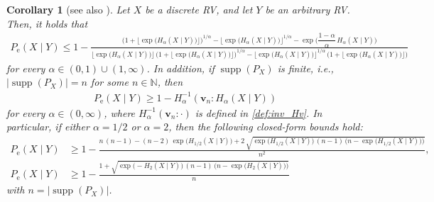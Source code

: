\documentclass[conference, draftcls, onecolumn]{IEEEtran}
\theoremstyle{plain}
\newtheorem{corollary}{Corollary}
\newcommand{\bvec}[1]{\boldsymbol{#1}}
\newcommand{\supp}{\operatorname{supp}}
\begin{document}
\begin{corollary}[{see also \cite[Theorems~5 and~12]{sason}}]
\label{cor:bound_Pe}
Let $X$ be a discrete RV, and let $Y$ be an arbitrary RV.
Then, it holds that
\begin{align}
P_{\mathrm{e}}(X \mid Y)
\le
1 - \frac{ \Big(1 + \Big\lfloor \exp \big( H_{\alpha}(X \mid Y) \big) \Big\rfloor \Big)^{1/\alpha} - \Big\lfloor \exp \big( H_{\alpha}(X \mid Y) \big) \Big\rfloor^{1/\alpha} - \exp \Big( \dfrac{ 1 - \alpha }{ \alpha } \, H_{\alpha}(X \mid Y) \Big) }{ \Big\lfloor \exp \big( H_{\alpha}(X \mid Y) \big) \Big\rfloor \, \Big(1 + \Big\lfloor \exp \big( H_{\alpha}(X \mid Y) \big) \Big\rfloor\Big)^{1/\alpha} - \Big\lfloor \exp \big( H_{\alpha}(X \mid Y) \big) \Big\rfloor^{1/\alpha} \, \Big(1 + \Big\lfloor \exp \big( H_{\alpha}(X \mid Y) \big) \Big\rfloor\Big) }
\label{eq:Pe_UB}
\end{align}
for every $\alpha \in (0, 1) \cup (1, \infty)$.
In addition, if $\supp( P_{X} )$ is finite, i.e., $|\!\supp( P_{X} )| = n$ for some $n \in \mathbb{N}$, then
\begin{align}
P_{\mathrm{e}}(X \mid Y)
\ge
1 - H_{\alpha}^{-1}( \bvec{v}_{n} : H_{\alpha}(X \mid Y) )
\label{eq:Pe_LB}
\end{align}
for every $\alpha \in (0, \infty)$, where $H_{\alpha}^{-1}( \bvec{v}_{n} : \cdot )$ is defined in \eqref{def:inv_Hv}.
In particular, if either $\alpha = 1/2$ or $\alpha = 2$, then the following closed-form bounds hold:
\begin{align}
P_{\mathrm{e}}(X \mid Y)
& \ge
1 - \frac{ n \, (n - 1) - (n-2) \, \exp\big( H_{1/2}(X \mid Y) \big) + 2 \, \sqrt{ \exp\big( H_{1/2}(X \mid Y) \big) \, (n-1) \, \big(n - \exp\big( H_{1/2}(X \mid Y) \big) \big) } }{ n^{2} } ,
\label{eq:Pe_LB_order_half} \\
P_{\mathrm{e}}(X \mid Y)
& \ge
1 - \frac{ 1 + \sqrt{ \exp\big( - H_{2}(X \mid Y) \big) \, (n-1) \, \big( n - \exp\big( H_{2}(X \mid Y) \big) \big) } }{ n }
\label{eq:Pe_LB_order_2}
\end{align}
with $n = |\!\supp( P_{X} )|$.
\end{corollary}
\end{document}

